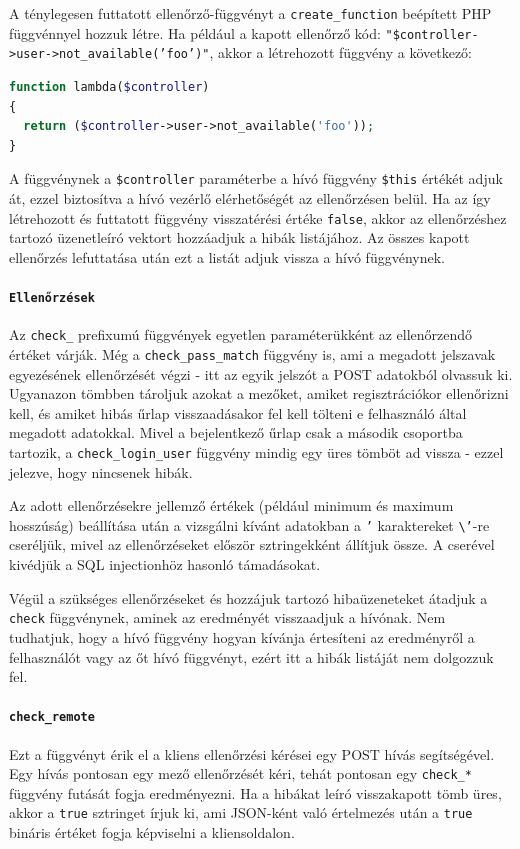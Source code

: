 \documentclass[12pt,a4paper,twoside]{article}
\begin{document}
A ténylegesen futtatott ellenőrző-függvényt a \texttt{create\_function}
beépített PHP függvénnyel hozzuk létre. Ha például a kapott ellenőrző kód:
\texttt{"\$controller->user->not\_available('foo')"}, akkor a létrehozott
függvény a következő:

\begin{lstlisting}[language=PHP, numbers=none]
function lambda($controller)
{
  return ($controller->user->not_available('foo'));
}
\end{lstlisting}

A függvénynek a \texttt{\$controller} paraméterbe a hívó függvény
\texttt{\$this} értékét adjuk át, ezzel biztosítva a hívó vezérlő elérhetőségét
az ellenőrzésen belül. Ha az így létrehozott és futtatott függvény visszatérési
értéke \texttt{false}, akkor az ellenőrzéshez tartozó üzenetleíró vektort
hozzáadjuk a hibák listájához. Az összes kapott ellenőrzés lefuttatása után
ezt a listát adjuk vissza a hívó függvénynek.


\paragraph{\texttt{Ellenőrzések}}
Az \texttt{check\_} prefixumú függvények egyetlen paraméterükként az
ellenőrzendő értéket várják. Még a \texttt{check\_pass\_match} függvény is, ami
a megadott jelszavak egyezésének ellenőrzését végzi - itt az egyik jelszót a POST adatokból
olvassuk ki. Ugyanazon tömbben tároljuk azokat a mezőket, amiket regisztrációkor
ellenőrizni kell, és amiket hibás űrlap visszaadásakor fel kell tölteni e
felhasználó által megadott adatokkal. Mivel a bejelentkező űrlap csak a második
csoportba tartozik, a \texttt{check\_login\_user} függvény mindig egy üres tömböt
ad vissza - ezzel jelezve, hogy nincsenek hibák.

Az adott ellenőrzésekre jellemző értékek (például minimum és maximum hosszúság)
beállítása után a vizsgálni kívánt adatokban a \texttt{'} karaktereket
\texttt{\textbackslash'}-re cseréljük, mivel az ellenőrzéseket először sztringekként állítjuk
össze. A cserével kivédjük a SQL injectionhöz hasonló támadásokat.

Végül a szükséges ellenőrzéseket és hozzájuk tartozó hibaüzeneteket átadjuk a
\texttt{check} függvénynek, aminek az eredményét visszaadjuk a hívónak. Nem
tudhatjuk, hogy a hívó függvény hogyan kívánja értesíteni az eredményről a
felhasználót vagy az őt hívó függvényt, ezért itt a hibák listáját nem dolgozzuk
fel.


\paragraph{\texttt{check\_remote}}
Ezt a függvényt érik el a kliens ellenőrzési kérései egy POST hívás
segítségével. Egy hívás pontosan egy mező ellenőrzését kéri, tehát pontosan egy
\texttt{check\_*} függvény futását fogja eredményezni. Ha a hibákat leíró
visszakapott tömb üres, akkor a \texttt{true} sztringet írjuk ki, ami JSON-ként
való értelmezés után a \texttt{true} bináris értéket fogja képviselni a
kliensoldalon.
\end{document}
